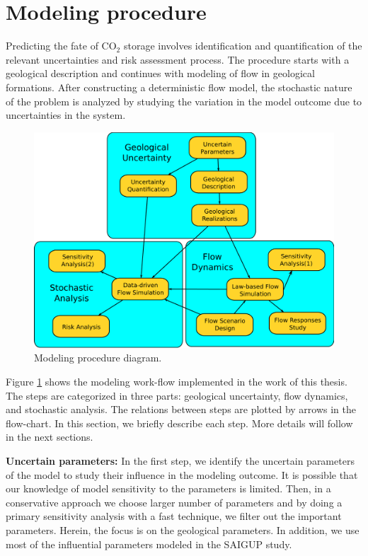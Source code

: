 \section{Modeling procedure}
\label{sec:MProcedure}

Predicting the fate of $\mbox{CO}_2$ storage involves identification and
quantification of the  relevant uncertainties and risk assessment process. The
procedure starts with a geological description and continues with modeling of
flow in geological formations. After constructing a deterministic flow model,
the stochastic nature of the problem is analyzed by studying the variation in
the model outcome due to uncertainties in the system. 

\begin{figure}
  \center
  \includegraphics[width=0.95 \linewidth]{./figurer/prc3}
  \caption{Modeling procedure diagram.}
  \label{fig:prc}
%
\end{figure}

Figure \ref{fig:prc} shows the modeling work-flow implemented in the work of
this thesis. The steps are categorized in three parts: geological uncertainty,
flow dynamics, and stochastic analysis. The relations between steps are plotted
by arrows in the flow-chart. In this section, we briefly describe each step.
More details will follow in the next sections.

\textbf{Uncertain parameters:} In the first step, we identify the uncertain
parameters of the model  to study their influence in the modeling outcome. It is
possible that our knowledge of model sensitivity to the parameters is limited.
Then, in a conservative approach we choose larger number of parameters and by
doing a primary sensitivity analysis with a fast technique, we filter out the
important parameters. Herein, the focus is on the geological parameters. In
addition, we use most of the influential parameters modeled in the SAIGUP study.

